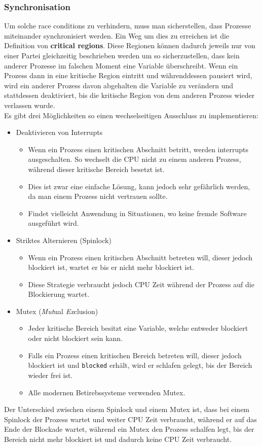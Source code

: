 \documentclass{article}
\begin{document}
	 \subsubsection{Synchronisation}
	 Um solche race conditions zu verhindern, muss man sicherstellen, dass Prozesse miteinander synchronisiert werden. Ein Weg um dies zu erreichen ist die Definition von \textbf{critical regions}. Diese Regionen können dadurch jeweils nur von einer Partei gleichzeitig beschrieben werden um so sicherzustellen, dass kein anderer Prozesse im falschen Moment eine Variable überschreibt. Wenn ein Prozess dann in eine kritische Region eintritt und währenddessen pausiert wird, wird ein anderer Prozess davon abgehalten die Variable zu verändern und stattdessen deaktiviert, bis die kritische Region von dem anderen Prozess wieder verlassen wurde.\\
	 Es gibt drei Möglichkeiten so einen wechselseitigen Ausschluss zu implementieren:
	 \begin{itemize}
	 	\item{Deaktivieren von Interrupts}
	 	\begin{itemize}
	 		\item{Wenn ein Prozess einen kritischen Abschnitt betritt, werden interrupts ausgeschalten. So wechselt die CPU nicht zu einem anderen Prozess, während dieser kritische Bereich besetzt ist.}
	 		\item{Dies ist zwar eine einfache Lösung, kann jedoch sehr gefährlich werden, da man einem Prozess nicht vertrauen sollte.}
	 		\item{Findet vielleicht Anwendung in Situationen, wo keine fremde Software ausgeführt wird.}
	 	\end{itemize}
	 	\item{Striktes Alternieren (Spinlock)}
	 	\begin{itemize}
	 		\item{Wenn ein Prozess einen kritischen Abschnitt betreten will, dieser jedoch blockiert ist, wartet er bis er nicht mehr blockiert ist.}
	 		\item{Diese Strategie verbraucht jedoch CPU Zeit während der Prozess auf die Blockierung wartet.}
	 	\end{itemize}
	 	\item{Mutex (\textit{Mut}ual \textit{Ex}clusion)}
	 	\begin{itemize}
	 		\item{Jeder kritische Bereich besitzt eine Variable, welche entweder blockiert oder nicht blockiert sein kann.}
	 		\item{Falls ein Prozess einen kritischen Bereich betreten will, dieser jedoch blockiert ist und \verb|blocked| erhält, wird er schlafen gelegt, bis der Bereich wieder frei ist.}
	 		\item{Alle modernen Betirebssysteme verwenden Mutex.}
	 	\end{itemize}
	 \end{itemize}
	 Der Unterschied zwischen einem Spinlock und einem Mutex ist, dass bei einem Spinlock der Prozess wartet und weiter CPU Zeit verbraucht, während er auf das Ende der Blockade wartet, während ein Mutex den Prozess schalfen legt, bis der Bereich nicht mehr blockiert ist und dadurch keine CPU Zeit verbraucht.
\end{document}
